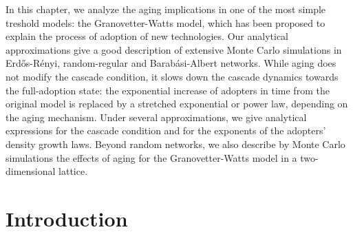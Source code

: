 In this chapter, we analyze the aging implications in one of the most simple treshold models: the Granovetter-Watts model, which has been proposed to  explain the process of adoption of new technologies. Our analytical approximations give a good description of extensive Monte Carlo simulations in Erd\H{o}s-R\'enyi, random-regular and Barab\'asi-Albert networks. While aging does not modify the cascade condition, it slows down the cascade dynamics towards the full-adoption state: the exponential increase of adopters in time from the original model is replaced by a stretched exponential or power law, depending on the aging mechanism. Under several approximations, we give analytical expressions for the cascade condition and for the exponents of the adopters' density growth laws. Beyond random networks, we also describe by Monte Carlo simulations the effects of aging for the Granovetter-Watts model in a two-dimensional lattice.

\section{\label{sec:Introduction} Introduction}


